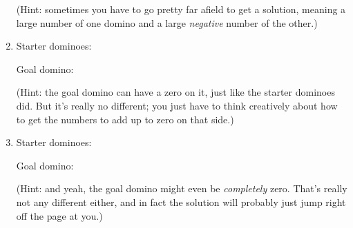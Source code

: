 \begin{enumerate}
\footnotesize
(Hint: sometimes you have to go pretty far afield to get a solution, meaning a
large number of one domino and a large \textit{negative} number of the other.)
\normalsize

\item Starter dominoes:
\hspace{.3in}
\hspace{.1in}

Goal domino:
\hspace{1.1in}

\footnotesize
(Hint: the goal domino can have a zero on it, just like the starter dominoes
did. But it's really no different; you just have to think creatively about how
to get the numbers to add up to zero on that side.)
\normalsize

\item Starter dominoes:
\hspace{.3in}
\hspace{.1in}

Goal domino:
\hspace{1.1in}

\footnotesize
(Hint: and yeah, the goal domino might even be \textit{completely} zero. That's
really not any different either, and in fact the solution will probably just
jump right off the page at you.)
\normalsize
\label{endDominoPuzzes}
\end{enumerate}

